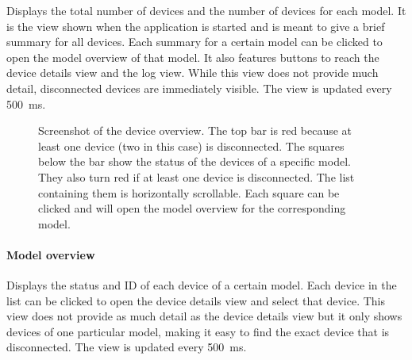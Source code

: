Displays the total number of devices and the number of devices for each model. It is the view shown
when the application is started and is meant to give a brief summary for all devices. Each summary
for a certain model can be clicked to open the model overview of that model. It also features buttons
to reach the device details view and the log view. While this view does not provide much detail,
disconnected devices are immediately visible. The view is updated every \SI{500}{\milli\second}.

\begin{figure}[H]
    \centering
    \setlength{\fboxsep}{0mm}
    \caption[Screenshot of the device overview]{
        Screenshot of the device overview. The top bar is red because at least one device (two in
        this case) is disconnected. The squares below the bar show the status of the devices of a
        specific model. They also turn red if at least one device is disconnected. The list containing
        them is horizontally scrollable. Each square can be clicked and will open the model overview
        for the corresponding model.
    }
\end{figure}

\clearpage
\paragraph{Model overview}

Displays the status and ID of each device of a certain model. Each device in the list can be clicked
to open the device details view and select that device. This view does not provide as much detail as
the device details view but it only shows devices of one particular model, making it easy to find
the exact device that is disconnected. The view is updated every \SI{500}{\milli\second}.

